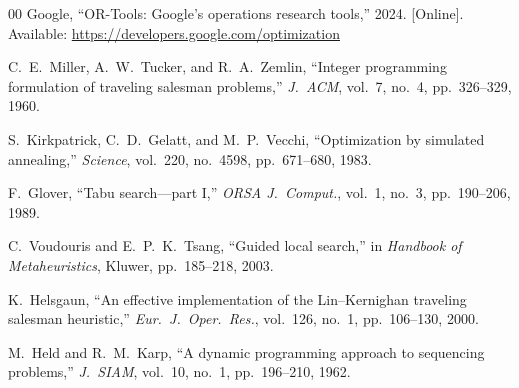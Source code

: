 \documentclass[conference]{IEEEtran}
\begin{document}
\begin{thebibliography}{00}
 Google, ``OR-Tools: Google's operations research tools,'' 2024. [Online]. Available: \url{https://developers.google.com/optimization}

 C.~E.~Miller, A.~W.~Tucker, and R.~A.~Zemlin, ``Integer programming formulation of traveling salesman problems,'' \emph{J.\ ACM}, vol.~7, no.~4, pp.~326--329, 1960.

 S.~Kirkpatrick, C.~D.~Gelatt, and M.~P.~Vecchi, ``Optimization by simulated annealing,'' \emph{Science}, vol.~220, no.~4598, pp.~671--680, 1983.

 F.~Glover, ``Tabu search---part I,'' \emph{ORSA J.\ Comput.}, vol.~1, no.~3, pp.~190--206, 1989.

 C.~Voudouris and E.~P.~K.~Tsang, ``Guided local search,'' in \emph{Handbook of Metaheuristics}, Kluwer, pp.~185--218, 2003.

 K.~Helsgaun, ``An effective implementation of the Lin--Kernighan traveling salesman heuristic,'' \emph{Eur.\ J.\ Oper.\ Res.}, vol.~126, no.~1, pp.~106--130, 2000.

 M.~Held and R.~M.~Karp, ``A dynamic programming approach to sequencing problems,'' \emph{J.\ SIAM}, vol.~10, no.~1, pp.~196--210, 1962.

\end{thebibliography}
\end{document}
